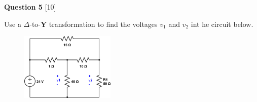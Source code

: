 \documentclass[12pt]{article}
\begin{document}
\vspace{0.1in}
\noindent
{\bf Question 5} [10] %

Use a $\Delta$-to-{\bf Y} transformation to find the voltages $v_1$ and $v_2$ int he circuit below.
\begin{figure}[h!]
\centering 
\includegraphics[clip,width=0.4\textwidth]{Fig3_58.png}
\end{figure}
 
\end{document}
